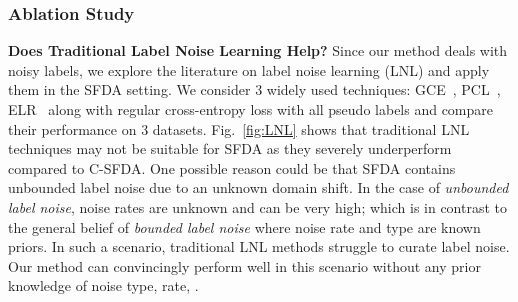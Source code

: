 \documentclass[10pt,twocolumn,letterpaper]{article}
\begin{document}
\vspace{-2mm}
\subsubsection{Ablation Study}
\vspace{-1mm}
\noindent \textbf{Does Traditional Label Noise Learning  Help?}
Since our method deals with noisy labels, we explore the literature on label noise learning (LNL) and apply them in the SFDA setting. We consider 3 widely used techniques: GCE~\cite{zhang2018generalized}, PCL~\cite{zhang2021learning}, ELR~\cite{liu2020early} along with regular cross-entropy loss with all pseudo labels and compare their performance on 3 datasets. Fig.~\ref{fig:LNL} shows that traditional LNL techniques may not be suitable for SFDA as they severely underperform compared to C-SFDA. One possible reason could be that SFDA contains unbounded label noise due to an unknown domain shift. In the case of \emph{unbounded label noise}, noise rates are unknown and can be very high; which is in contrast to the general belief of \emph{bounded label noise} where noise rate and type are known priors. In such a scenario, traditional LNL methods struggle to curate label noise. Our method can convincingly perform well in this scenario without any prior knowledge of noise type, rate, \etc. 
\end{document}
